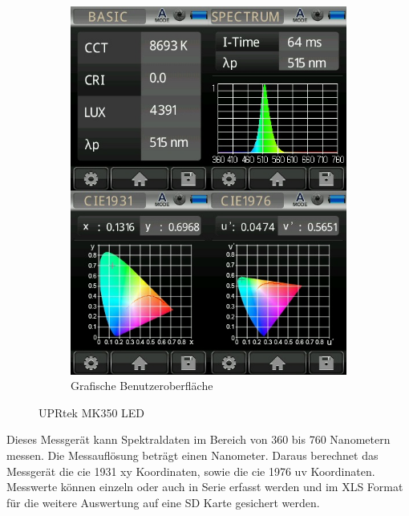 \documentclass[11pt]{scrartcl}
\begin{document}
\begin{figure}[H]
\begin{subfigure}[b]{0.49\textwidth}
        \includegraphics[width=\textwidth]{images/mk350_lightcan_green.JPG}
        \caption{Grafische Benutzeroberfläche}
    \end{subfigure}
    \caption{UPRtek MK350 LED}
\end{figure}
\noindent
Dieses Messgerät kann Spektraldaten im Bereich von 360 bis 760 Nanometern messen. Die Messauflösung beträgt einen Nanometer. Daraus
berechnet das Messgerät die \ac{cie} 1931 xy Koordinaten, sowie die \ac{cie} 1976 uv Koordinaten. Messwerte können einzeln oder auch in
Serie erfasst werden und im XLS Format für die weitere Auswertung auf eine SD Karte gesichert werden.
\clearpage
\end{document}
